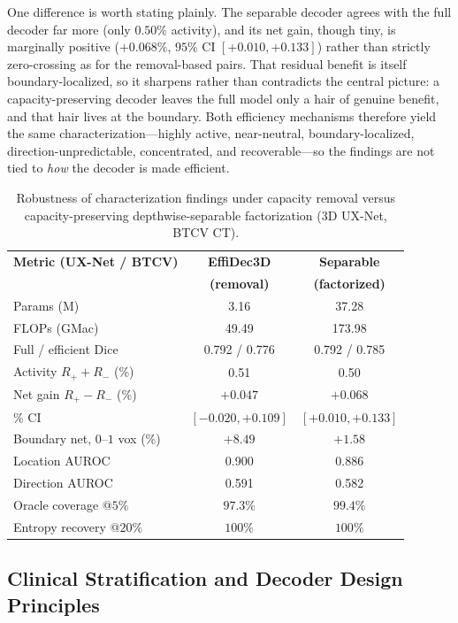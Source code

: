 One difference is worth stating plainly. The separable decoder agrees with the full decoder far more (only $0.50\%$ activity), and its net gain, though tiny, is marginally positive ($+0.068\%$, $95\%$ CI $[+0.010, +0.133]$) rather than strictly zero-crossing as for the removal-based pairs. That residual benefit is itself boundary-localized, so it sharpens rather than contradicts the central picture: a capacity-preserving decoder leaves the full model only a hair of genuine benefit, and that hair lives at the boundary. Both efficiency mechanisms therefore yield the same characterization---highly active, near-neutral, boundary-localized, direction-unpredictable, concentrated, and recoverable---so the findings are not tied to \emph{how} the decoder is made efficient.

\begin{table}[t]
\centering
\caption{Robustness of characterization findings under capacity removal versus capacity-preserving depthwise-separable factorization (3D UX-Net, BTCV CT).}
\label{tab:robustness}
\small
\begin{tabular}{@{}lcc@{}}
\toprule
\textbf{Metric (UX-Net / BTCV)} & \textbf{EffiDec3D} & \textbf{Separable} \\
 & \textbf{(removal)} & \textbf{(factorized)} \\
\midrule
Params (M) & 3.16 & 37.28 \\
FLOPs (GMac) & 49.49 & 173.98 \\
Full / efficient Dice & 0.792 / 0.776 & 0.792 / 0.785 \\
Activity $R_{+}+R_{-}$ (\%) & 0.51 & 0.50 \\
Net gain $R_{+}-R_{-}$ (\%) & $+0.047$ & $+0.068$ \\
\quad 95\% CI & $[-0.020,+0.109]$ & $[+0.010,+0.133]$ \\
Boundary net, $0$--$1$ vox (\%) & $+8.49$ & $+1.58$ \\
Location AUROC & 0.900 & 0.886 \\
Direction AUROC & 0.591 & 0.582 \\
Oracle coverage @$5\%$ & $97.3\%$ & $99.4\%$ \\
Entropy recovery @$20\%$ & $100\%$ & $100\%$ \\
\bottomrule
\end{tabular}
\end{table}

\subsection{Clinical Stratification and Decoder Design Principles}
\label{sec:clinical_implications}

